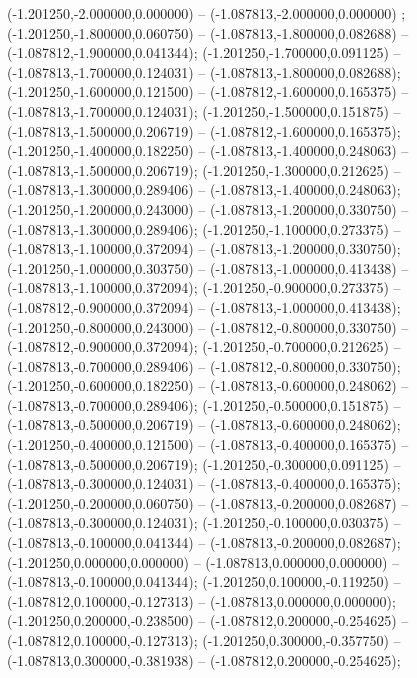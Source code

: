  (-1.201250,-2.000000,0.000000) -- (-1.087813,-2.000000,0.000000) ;
 (-1.201250,-1.800000,0.060750) -- (-1.087813,-1.800000,0.082688) -- (-1.087812,-1.900000,0.041344);
 (-1.201250,-1.700000,0.091125) -- (-1.087813,-1.700000,0.124031) -- (-1.087813,-1.800000,0.082688);
 (-1.201250,-1.600000,0.121500) -- (-1.087812,-1.600000,0.165375) -- (-1.087813,-1.700000,0.124031);
 (-1.201250,-1.500000,0.151875) -- (-1.087813,-1.500000,0.206719) -- (-1.087812,-1.600000,0.165375);
 (-1.201250,-1.400000,0.182250) -- (-1.087813,-1.400000,0.248063) -- (-1.087813,-1.500000,0.206719);
 (-1.201250,-1.300000,0.212625) -- (-1.087813,-1.300000,0.289406) -- (-1.087813,-1.400000,0.248063);
 (-1.201250,-1.200000,0.243000) -- (-1.087813,-1.200000,0.330750) -- (-1.087813,-1.300000,0.289406);
 (-1.201250,-1.100000,0.273375) -- (-1.087813,-1.100000,0.372094) -- (-1.087813,-1.200000,0.330750);
 (-1.201250,-1.000000,0.303750) -- (-1.087813,-1.000000,0.413438) -- (-1.087813,-1.100000,0.372094);
 (-1.201250,-0.900000,0.273375) -- (-1.087812,-0.900000,0.372094) -- (-1.087813,-1.000000,0.413438);
 (-1.201250,-0.800000,0.243000) -- (-1.087812,-0.800000,0.330750) -- (-1.087812,-0.900000,0.372094);
 (-1.201250,-0.700000,0.212625) -- (-1.087813,-0.700000,0.289406) -- (-1.087812,-0.800000,0.330750);
 (-1.201250,-0.600000,0.182250) -- (-1.087813,-0.600000,0.248062) -- (-1.087813,-0.700000,0.289406);
 (-1.201250,-0.500000,0.151875) -- (-1.087813,-0.500000,0.206719) -- (-1.087813,-0.600000,0.248062);
 (-1.201250,-0.400000,0.121500) -- (-1.087813,-0.400000,0.165375) -- (-1.087813,-0.500000,0.206719);
 (-1.201250,-0.300000,0.091125) -- (-1.087813,-0.300000,0.124031) -- (-1.087813,-0.400000,0.165375);
 (-1.201250,-0.200000,0.060750) -- (-1.087813,-0.200000,0.082687) -- (-1.087813,-0.300000,0.124031);
 (-1.201250,-0.100000,0.030375) -- (-1.087813,-0.100000,0.041344) -- (-1.087813,-0.200000,0.082687);
 (-1.201250,0.000000,0.000000) -- (-1.087813,0.000000,0.000000) -- (-1.087813,-0.100000,0.041344);
 (-1.201250,0.100000,-0.119250) -- (-1.087812,0.100000,-0.127313) -- (-1.087813,0.000000,0.000000);
 (-1.201250,0.200000,-0.238500) -- (-1.087812,0.200000,-0.254625) -- (-1.087812,0.100000,-0.127313);
 (-1.201250,0.300000,-0.357750) -- (-1.087813,0.300000,-0.381938) -- (-1.087812,0.200000,-0.254625);
